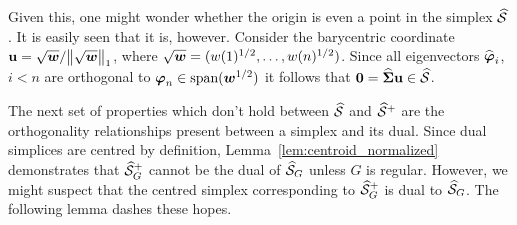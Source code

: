 Given this, one might wonder whether the origin is even a point in the simplex $\widehat{\mathcal{S}}$. It is easily seen that it is, however. Consider the barycentric coordinate $\vb{u} = \sqrt{\vb*{w}}/\norm{\sqrt{\vb*{w}}}_1$, where $\sqrt{\vb*{w}}=(w(1)^{1/2}, \dots, w(n)^{1/2})$. Since all eigenvectors $\widehat{\vb*{\varphi}}_i$, $i<n$ are orthogonal to $\vb*{\varphi}_n \in\textnormal{span}(\vb*{w}^{1/2})$ it follows that $\vb{0} = \widehat{\boldsymbol{\Sigma}}\vb{u}\in\widehat{\mathcal{S}}$. 

The next set of properties which don't hold between $\widehat{\mathcal{S}}$ and $\widehat{\mathcal{S}}^+$ are the orthogonality relationships present between a simplex and its dual. Since dual simplices are centred by definition, Lemma~\ref{lem:centroid_normalized} demonstrates that $\widehat{\mathcal{S}}_G^+$ cannot be the dual  of $\widehat{\mathcal{S}}_G$ unless $G$ is regular. However, we might suspect that the centred simplex corresponding to $\widehat{\mathcal{S}}^+_G$ is dual to $\widehat{\mathcal{S}}_G$. The following lemma dashes these hopes.  


